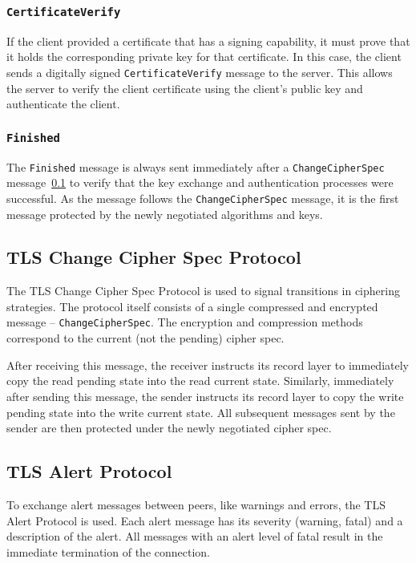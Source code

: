 \subsubsection{\texttt{CertificateVerify}}
    If the client provided a certificate that has a signing capability, it
    must prove that it holds the corresponding private key for that certificate.
    In this case, the client sends a digitally signed \texttt{CertificateVerify}
    message to the server. This allows the server to verify the client certificate
    using the client's public key and authenticate the client.

\subsubsection{\texttt{Finished}}
    The \texttt{Finished} message is always sent immediately after a
    \texttt{ChangeCipherSpec} message~\ref{ref:change_cipher_spec} to verify
    that the key exchange and authentication processes were successful.
    As the message follows the \texttt{ChangeCipherSpec} message, it is the
    first message protected by the newly negotiated algorithms and keys.

\subsection{TLS Change Cipher Spec Protocol} \label{ref:change_cipher_spec}
    The TLS Change Cipher Spec Protocol is used to signal transitions in
    ciphering strategies. The protocol itself consists of a single compressed
    and encrypted message -- \texttt{ChangeCipherSpec}. The encryption and
    compression methods correspond to the current (not the pending) cipher
    spec.

    After receiving this message, the receiver instructs its record layer
    to immediately copy the read pending state into the read current state.
    Similarly, immediately after sending this message, the sender instructs
    its record layer to copy the write pending state into the write current
    state. All subsequent messages sent by the sender are then protected under
    the newly negotiated cipher spec.

\subsection{TLS Alert Protocol}
    To exchange alert messages between peers, like warnings and errors, the
    TLS Alert Protocol is used. Each alert message has its severity (warning,
    fatal) and a description of the alert. All messages with an alert level
    of fatal result in the immediate termination of the connection.

